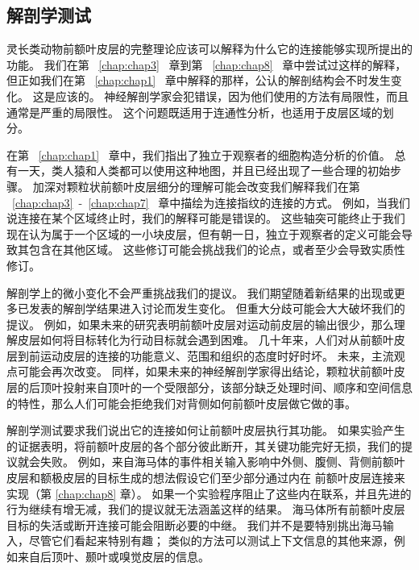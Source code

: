 \subsection{解剖学测试}

灵长类动物前额叶皮层的完整理论应该可以解释为什么它的连接能够实现所提出的功能。
我们在第 ~\ref{chap:chap3}~ 章到第 ~\ref{chap:chap8}~ 章中尝试过这样的解释，但正如我们在第 ~\ref{chap:chap1}~ 章中解释的那样，公认的解剖结构会不时发生变化。
这是应该的。
神经解剖学家会犯错误，因为他们使用的方法有局限性，而且通常是严重的局限性。
这个问题既适用于连通性分析，也适用于皮层区域的划分。
\par


在第 ~\ref{chap:chap1}~ 章中，我们指出了独立于观察者的细胞构造分析的价值。
总有一天，类人猿和人类都可以使用这种地图，并且已经出现了一些合理的初始步骤。
加深对颗粒状前额叶皮层细分的理解可能会改变我们解释我们在第 ~\ref{chap:chap3}~-~\ref{chap:chap7}~ 章中描绘为连接指纹的连接的方式。
例如，当我们说连接在某个区域终止时，我们的解释可能是错误的。
这些轴突可能终止于我们现在认为属于一个区域的一小块皮层，但有朝一日，独立于观察者的定义可能会导致其包含在其他区域。
这些修订可能会挑战我们的论点，或者至少会导致实质性修订。
\par


解剖学上的微小变化不会严重挑战我们的提议。
我们期望随着新结果的出现或更多已发表的解剖学结果进入讨论而发生变化。
但重大分歧可能会大大破坏我们的提议。
例如，如果未来的研究表明前额叶皮层对运动前皮层的输出很少，那么理解皮层如何将目标转化为行动目标就会遇到困难。
几十年来，人们对从前额叶皮层到前运动皮层的连接的功能意义、范围和组织的态度时好时坏。
未来，主流观点可能会再次改变。
同样，如果未来的神经解剖学家得出结论，颗粒状前额叶皮层的后顶叶投射来自顶叶的一个受限部分，该部分缺乏处理时间、顺序和空间信息的特性，那么人们可能会拒绝我们对背侧如何前额叶皮层做它做的事。
\par


解剖学测试要求我们说出它的连接如何让前额叶皮层执行其功能。
如果实验产生的证据表明，将前额叶皮层的各个部分彼此断开，其关键功能完好无损，我们的提议就会失败。
例如，来自海马体的事件相关输入影响中外侧、腹侧、背侧前额叶皮层和额极皮层的目标生成的想法假设它们至少部分通过内在 前额叶皮层连接来实现（第 \ref{chap:chap8} 章）。
如果一个实验程序阻止了这些内在联系，并且先进的行为继续有增无减，我们的提议就无法涵盖这样的结果。
海马体所有前额叶皮层 目标的失活或断开连接可能会阻断必要的中继。
我们并不是要特别挑出海马输入，尽管它们看起来特别有趣；
类似的方法可以测试上下文信息的其他来源，例如来自后顶叶、颞叶或嗅觉皮层的信息。




